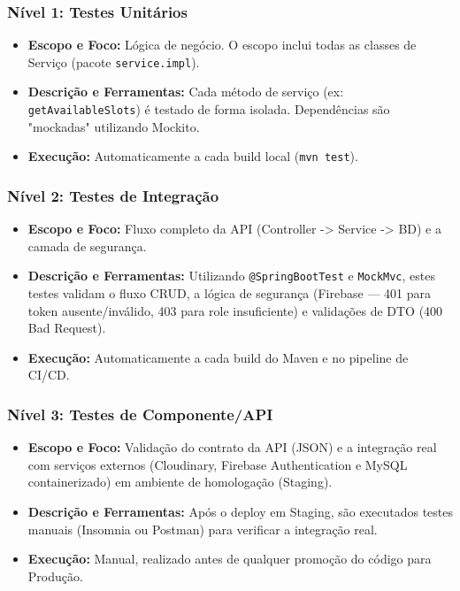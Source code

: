 \documentclass[
    12pt, 
    a4paper, 
    oneside, 
    chapter=TITLE, 
    section=TITLE
]{abntex2}
\begin{document}
\subsubsection{Nível 1: Testes Unitários}
\begin{itemize}
    \item \textbf{Escopo e Foco:} Lógica de negócio. O escopo inclui todas as classes de Serviço (pacote \texttt{service.impl}).
    \item \textbf{Descrição e Ferramentas:} Cada método de serviço (ex: \texttt{getAvailableSlots}) é testado de forma isolada. Dependências são "mockadas" utilizando Mockito.
    \item \textbf{Execução:} Automaticamente a cada build local (\texttt{mvn test}).
\end{itemize}

\subsubsection{Nível 2: Testes de Integração}
\begin{itemize}
    \item \textbf{Escopo e Foco:} Fluxo completo da API (Controller -> Service -> BD) e a camada de segurança.
    \item \textbf{Descrição e Ferramentas:} Utilizando \texttt{@SpringBootTest} e \texttt{MockMvc}, estes testes validam o fluxo CRUD, a lógica de segurança (Firebase — 401 para token ausente/inválido, 403 para role insuficiente) e validações de DTO (400 Bad Request).
    \item \textbf{Execução:} Automaticamente a cada build do Maven e no pipeline de CI/CD.
\end{itemize}

\subsubsection{Nível 3: Testes de Componente/API}
\begin{itemize}
    \item \textbf{Escopo e Foco:} Validação do contrato da API (JSON) e a integração real com serviços externos (Cloudinary, Firebase Authentication e MySQL containerizado) em ambiente de homologação (Staging).
    \item \textbf{Descrição e Ferramentas:} Após o deploy em Staging, são executados testes manuais (Insomnia ou Postman) para verificar a integração real.
    \item \textbf{Execução:} Manual, realizado antes de qualquer promoção do código para Produção.
\end{itemize}
\end{document}
